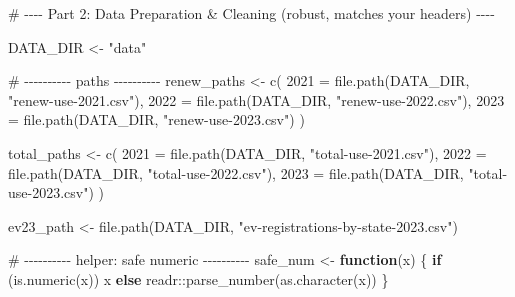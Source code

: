 \documentclass[
  english,
  letterpaper,
  DIV=11,
  numbers=noendperiod]{scrartcl}
\newenvironment{Shaded}{\begin{snugshade}}{\end{snugshade}}
\newcommand{\AttributeTok}[1]{\textcolor[rgb]{0.40,0.45,0.13}{#1}}
\newcommand{\CommentTok}[1]{\textcolor[rgb]{0.37,0.37,0.37}{#1}}
\newcommand{\ControlFlowTok}[1]{\textcolor[rgb]{0.00,0.23,0.31}{\textbf{#1}}}
\newcommand{\FunctionTok}[1]{\textcolor[rgb]{0.28,0.35,0.67}{#1}}
\newcommand{\NormalTok}[1]{\textcolor[rgb]{0.00,0.23,0.31}{#1}}
\newcommand{\OtherTok}[1]{\textcolor[rgb]{0.00,0.23,0.31}{#1}}
\newcommand{\SpecialCharTok}[1]{\textcolor[rgb]{0.37,0.37,0.37}{#1}}
\newcommand{\StringTok}[1]{\textcolor[rgb]{0.13,0.47,0.30}{#1}}
\begin{document}
\begin{Shaded}
\begin{Highlighting}[]
\CommentTok{\# {-}{-}{-}{-} Part 2: Data Preparation \& Cleaning (robust, matches your headers) {-}{-}{-}{-}}

\NormalTok{DATA\_DIR }\OtherTok{\textless{}{-}} \StringTok{"data"}

\CommentTok{\# {-}{-}{-}{-}{-}{-}{-}{-}{-}{-} paths {-}{-}{-}{-}{-}{-}{-}{-}{-}{-}}
\NormalTok{renew\_paths }\OtherTok{\textless{}{-}} \FunctionTok{c}\NormalTok{(}
  \StringTok{\textasciigrave{}}\AttributeTok{2021}\StringTok{\textasciigrave{}} \OtherTok{=} \FunctionTok{file.path}\NormalTok{(DATA\_DIR, }\StringTok{"renew{-}use{-}2021.csv"}\NormalTok{),}
  \StringTok{\textasciigrave{}}\AttributeTok{2022}\StringTok{\textasciigrave{}} \OtherTok{=} \FunctionTok{file.path}\NormalTok{(DATA\_DIR, }\StringTok{"renew{-}use{-}2022.csv"}\NormalTok{),}
  \StringTok{\textasciigrave{}}\AttributeTok{2023}\StringTok{\textasciigrave{}} \OtherTok{=} \FunctionTok{file.path}\NormalTok{(DATA\_DIR, }\StringTok{"renew{-}use{-}2023.csv"}\NormalTok{)}
\NormalTok{)}

\NormalTok{total\_paths }\OtherTok{\textless{}{-}} \FunctionTok{c}\NormalTok{(}
  \StringTok{\textasciigrave{}}\AttributeTok{2021}\StringTok{\textasciigrave{}} \OtherTok{=} \FunctionTok{file.path}\NormalTok{(DATA\_DIR, }\StringTok{"total{-}use{-}2021.csv"}\NormalTok{),}
  \StringTok{\textasciigrave{}}\AttributeTok{2022}\StringTok{\textasciigrave{}} \OtherTok{=} \FunctionTok{file.path}\NormalTok{(DATA\_DIR, }\StringTok{"total{-}use{-}2022.csv"}\NormalTok{),}
  \StringTok{\textasciigrave{}}\AttributeTok{2023}\StringTok{\textasciigrave{}} \OtherTok{=} \FunctionTok{file.path}\NormalTok{(DATA\_DIR, }\StringTok{"total{-}use{-}2023.csv"}\NormalTok{)}
\NormalTok{)}

\NormalTok{ev23\_path }\OtherTok{\textless{}{-}} \FunctionTok{file.path}\NormalTok{(DATA\_DIR, }\StringTok{"ev{-}registrations{-}by{-}state{-}2023.csv"}\NormalTok{)}

\CommentTok{\# {-}{-}{-}{-}{-}{-}{-}{-}{-}{-} helper: safe numeric {-}{-}{-}{-}{-}{-}{-}{-}{-}{-}}
\NormalTok{safe\_num }\OtherTok{\textless{}{-}} \ControlFlowTok{function}\NormalTok{(x) \{}
  \ControlFlowTok{if}\NormalTok{ (}\FunctionTok{is.numeric}\NormalTok{(x)) x }\ControlFlowTok{else}\NormalTok{ readr}\SpecialCharTok{::}\FunctionTok{parse\_number}\NormalTok{(}\FunctionTok{as.character}\NormalTok{(x))}
\NormalTok{\}}


\end{Highlighting}
\end{Shaded}
\end{document}
